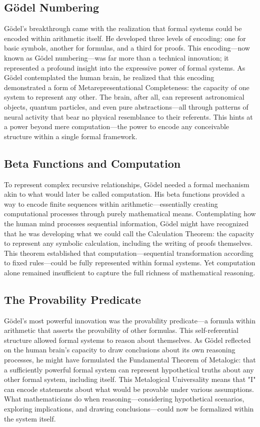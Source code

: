 \documentclass[runningheads]{llncs}
\begin{document}
\subsection{Gödel Numbering}

Gödel's breakthrough came with the realization that formal systems could be encoded within arithmetic itself. He developed three levels of encoding: one for basic symbols, another for formulas, and a third for proofs. This encoding—now known as Gödel numbering—was far more than a technical innovation; it represented a profound insight into the expressive power of formal systems. As Gödel contemplated the human brain, he realized that this encoding demonstrated a form of Metarepresentational Completeness: the capacity of one system to represent any other. The brain, after all, can represent astronomical objects, quantum particles, and even pure abstractions—all through patterns of neural activity that bear no physical resemblance to their referents. This hints at a power beyond mere computation—the power to encode any conceivable structure within a single formal framework.

\subsection{Beta Functions and Computation}

To represent complex recursive relationships, Gödel needed a formal mechanism akin to what would later be called computation. His beta functions provided a way to encode finite sequences within arithmetic—essentially creating computational processes through purely mathematical means. Contemplating how the human mind processes sequential information, Gödel might have recognized that he was developing what we could call the Calculation Theorem: the capacity to represent any symbolic calculation, including the writing of proofs themselves. This theorem established that computation—sequential transformation according to fixed rules—could be fully represented within formal systems. Yet computation alone remained insufficient to capture the full richness of mathematical reasoning.

\subsection{The Provability Predicate}

Gödel's most powerful innovation was the provability predicate—a formula within arithmetic that asserts the provability of other formulas. This self-referential structure allowed formal systems to reason about themselves. As Gödel reflected on the human brain's capacity to draw conclusions about its own reasoning processes, he might have formulated the Fundamental Theorem of Metalogic: that a sufficiently powerful formal system can represent hypothetical truths about any other formal system, including itself. This Metalogical Universality means that "I" can encode statements about what would be provable under various assumptions. What mathematicians do when reasoning—considering hypothetical scenarios, exploring implications, and drawing conclusions—could now be formalized within the system itself.
\end{document}
